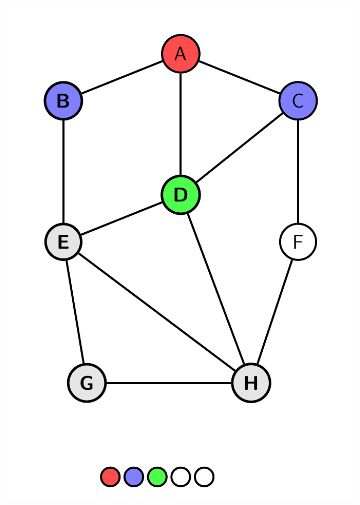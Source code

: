 \documentclass[14pt]{extreport}
\begin{document}
		\begin{figure}[h]
            \centering
            \begin{subfigure}[t]{0.45\textwidth}
                \centering
                \includegraphics[width=0.9\linewidth]{diagrams/greedy-1.png}
                \subcaption{}
            \end{subfigure}
            \hfill
            \begin{subfigure}[t]{0.45\textwidth}
                \centering

\end{subfigure}
\end{figure}
\end{document}
